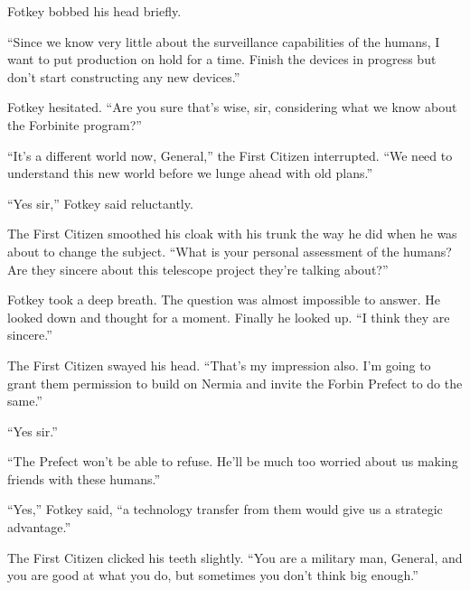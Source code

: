 Fotkey bobbed his head briefly.

``Since we know very little about the surveillance capabilities of the humans, I want to put
production on hold for a time. Finish the devices in progress but don't start constructing any
new devices.''

Fotkey hesitated. ``Are you sure that's wise, sir, considering what we know about the Forbinite
program?''

``It's a different world now, General,'' the First Citizen interrupted. ``We need to understand
this new world before we lunge ahead with old plans.''

``Yes sir,'' Fotkey said reluctantly.

The First Citizen smoothed his cloak with his trunk the way he did when he was about to change
the subject. ``What is your personal assessment of the humans? Are they sincere about this
telescope project they're talking about?''

Fotkey took a deep breath. The question was almost impossible to answer. He looked down and
thought for a moment. Finally he looked up. ``I think they are sincere.''

The First Citizen swayed his head. ``That's my impression also. I'm going to grant them
permission to build on Nermia and invite the Forbin Prefect to do the same.''

``Yes sir.''

``The Prefect won't be able to refuse. He'll be much too worried about us making friends with
these humans.''

``Yes,'' Fotkey said, ``a technology transfer from them would give us a strategic advantage.''

The First Citizen clicked his teeth slightly. ``You are a military man, General, and you are
good at what you do, but sometimes you don't think big enough.''
